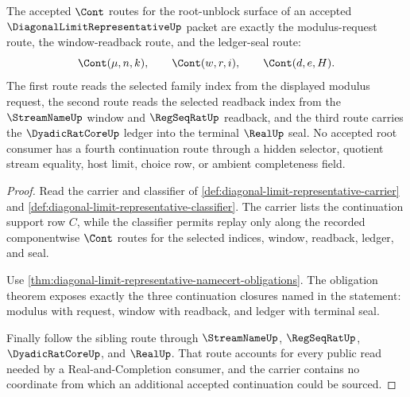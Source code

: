 \begin{theorem}
\label{thm:diagonal-limit-representative-cont-route-closure}
The accepted $\Cont$ routes for the root-unblock surface of an accepted $\DiagonalLimitRepresentativeUp$ packet are exactly the modulus-request route, the window-readback route, and the ledger-seal route:
$$
\Cont(\mu,n,k),\qquad \Cont(w,r,i),\qquad \Cont(d,e,H).
$$
The first route reads the selected family index from the displayed modulus request, the second route reads the selected readback index from the $\StreamNameUp$ window and $\RegSeqRatUp$ readback, and the third route carries the $\DyadicRatCoreUp$ ledger into the terminal $\RealUp$ seal. No accepted root consumer has a fourth continuation route through a hidden selector, quotient stream equality, host limit, choice row, or ambient completeness field.
\end{theorem}
\begin{proof}
Read the carrier and classifier of \autoref{def:diagonal-limit-representative-carrier} and \autoref{def:diagonal-limit-representative-classifier}. The carrier lists the continuation support row $C$, while the classifier permits replay only along the recorded componentwise $\Cont$ routes for the selected indices, window, readback, ledger, and seal.

Use \autoref{thm:diagonal-limit-representative-namecert-obligations}. The obligation theorem exposes exactly the three continuation closures named in the statement: modulus with request, window with readback, and ledger with terminal seal.

Finally follow the sibling route through $\StreamNameUp$, $\RegSeqRatUp$, $\DyadicRatCoreUp$, and $\RealUp$. That route accounts for every public read needed by a Real-and-Completion consumer, and the carrier contains no coordinate from which an additional accepted continuation could be sourced.
\end{proof}

